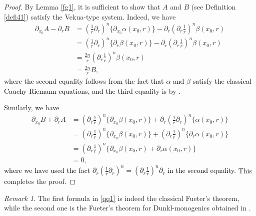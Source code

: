 \documentclass{amsart}
\theoremstyle{definition}
\theoremstyle{remark}
\newtheorem{remark}[theorem]{Remark}
\numberwithin{equation}{section}
\begin{document}
\begin{proof} By Lemma \ref{fg1}, it is sufficient to show that $A$ and $B$ (see Definition \ref{defi41}) satisfy the Vekua-type system. Indeed, we have
    \begin{equation*}
        \begin{split}
            \partial_{x_{0}}A-\partial_{r}B&=\left(\frac{1}{r}\partial_{r}\right)^{n}\{\partial_{x_{0}}\alpha(x_{0}, r)\}-\partial_{r}\left(\partial_{r}\frac{1}{r}\right)^{n}\beta(x_{0}, r)\\
            &=\left(\frac{1}{r}\partial_{r}\right)^{n}\{\partial_{r}\beta(x_{0}, r)\}-\partial_{r}\left(\partial_{r}\frac{1}{r}\right)^{n}\beta(x_{0}, r)\\
            &=\frac{2n}{r}\left(\partial_{r}\frac{1}{r}\right)^{n}\beta(x_{0}, r)\\
            &=\frac{2n}{r}B,
        \end{split}
    \end{equation*}
    \textcolor{black}{where the second equality follows from the fact that $\alpha$ and $\beta$ satisfy the classical Cauchy-Riemann equations,  and the third equality is by \cite[Lemma 4.1 (iv)]{fck}.}

    Similarly, we have
  \begin{equation*}
        \begin{split}
            \partial_{x_{0}}B+\partial_{r}A&=\left(\partial_{r}\frac{1}{r}\right)^{n} \{\partial_{x_{0}}\beta(x_{0},r)\}+
            \partial_{r}\left(\frac{1}{r}\partial_{r}\right)^{n}\{\alpha(x_{0}, r)\}\\
            &=\left(\partial_{r}\frac{1}{r}\right)^{n} \{\partial_{x_{0}}\beta(x_{0},r)\}+
            \left(\partial_{r}\frac{1}{r}\right)^{n}\{\partial_{r}\alpha(x_{0}, r)\}\\
            &=\left(\partial_{r}\frac{1}{r}\right)^{n}\{\partial_{x_{0}}\beta(x_{0}, r)+\partial_{r}\alpha(x_{0}, r) \}\\
            &=0,
        \end{split}
    \end{equation*}
   \textcolor{black}{where we have used the fact $ \partial_{r}\left(\frac{1}{r}\partial_{r}\right)^{n} =\left(\partial_{r}\frac{1}{r}\right)^{n}\partial_{r}$ in the second equality.}
  This completes the proof.
\end{proof}
\begin{remark} The first formula in \eqref{qq1} is indeed the classical Fueter's theorem, while the second one is  the  Fueter's theorem for Dunkl-monogenics obtained in \cite[Theorem 1.1]{fck}.
\end{remark}
\end{document}

